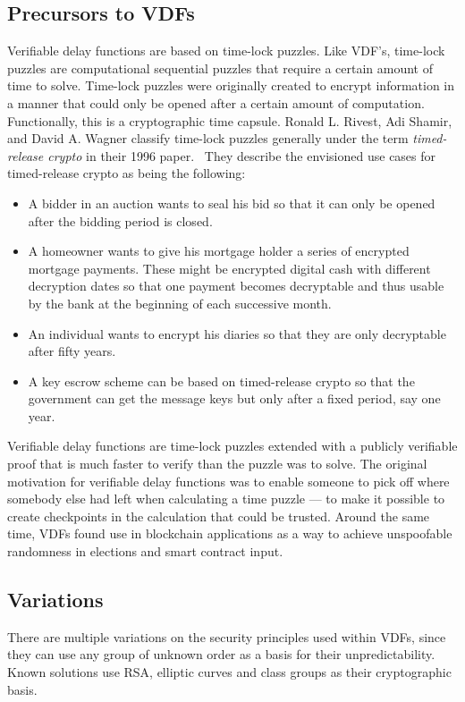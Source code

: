 
\subsection{Precursors to VDFs}
Verifiable delay functions are based on time-lock puzzles. Like VDF's, time-lock puzzles are computational sequential puzzles that require a certain amount of time to solve.\cite{Rivest_undated-qr} Time-lock puzzles were originally created to encrypt information in a manner that could only be opened after a certain amount of computation. Functionally, this is a cryptographic time capsule. Ronald L. Rivest, Adi Shamir, and David A. Wagner classify time-lock puzzles generally under the term \emph{timed-release crypto} in their 1996 paper.~\cite{Rivest_undated-qr} They describe the envisioned use cases for timed-release crypto as being the following:

\begin{itemize}
	\item A bidder in an auction wants to seal his bid so that it can only be opened after the bidding period is closed.
	\item A homeowner wants to give his mortgage holder a series of encrypted mortgage payments. These might be encrypted digital cash with different decryption dates so that one payment becomes decryptable and thus usable by the bank at the beginning of each successive month.
	\item An individual wants to encrypt his diaries so that they are only decryptable after fifty years.
	\item A key escrow scheme can be based on timed-release crypto so that the government can get the message keys but only after a fixed period, say one year.
\end{itemize}

Verifiable delay functions are time-lock puzzles extended with a publicly verifiable proof that is much faster to verify than the puzzle was to solve. The original motivation for verifiable delay functions was to enable someone to pick off where somebody else had left when calculating a time puzzle --- to make it possible to create checkpoints in the calculation that could be trusted. Around the same time, VDFs found use in blockchain applications as a way to achieve unspoofable randomness in elections and smart contract input.

\subsection{Variations}
There are multiple variations on the security principles used within VDFs, since they can use any group of unknown order as a basis for their unpredictability. Known solutions use RSA, elliptic curves and class groups as their cryptographic basis.

